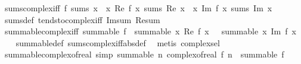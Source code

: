 \begin{isabellebody}
\endisatagproof
{\isafoldproof}%
%
\isadelimproof
\isanewline
%
\endisadelimproof
\isanewline
{}\isamarkupfalse%
\ sums{\isacharunderscore}{\kern0pt}complex{\isacharunderscore}{\kern0pt}iff{\isacharcolon}{\kern0pt}\ {\isachardoublequoteopen}f\ sums\ x\ {\isasymlongleftrightarrow}\ {\isacharparenleft}{\kern0pt}{\isacharparenleft}{\kern0pt}{\isasymlambda}x{\isachardot}{\kern0pt}\ Re\ {\isacharparenleft}{\kern0pt}f\ x{\isacharparenright}{\kern0pt}{\isacharparenright}{\kern0pt}\ sums\ Re\ x{\isacharparenright}{\kern0pt}\ {\isasymand}\ {\isacharparenleft}{\kern0pt}{\isacharparenleft}{\kern0pt}{\isasymlambda}x{\isachardot}{\kern0pt}\ Im\ {\isacharparenleft}{\kern0pt}f\ x{\isacharparenright}{\kern0pt}{\isacharparenright}{\kern0pt}\ sums\ Im\ x{\isacharparenright}{\kern0pt}{\isachardoublequoteclose}\isanewline
%
\isadelimproof
\ \ %
\endisadelimproof
%
\isatagproof
{}\isamarkupfalse%
\ sums{\isacharunderscore}{\kern0pt}def\ tendsto{\isacharunderscore}{\kern0pt}complex{\isacharunderscore}{\kern0pt}iff\ Im{\isacharunderscore}{\kern0pt}sum\ Re{\isacharunderscore}{\kern0pt}sum\ \isacommand{{\isachardot}{\kern0pt}{\isachardot}{\kern0pt}}\isamarkupfalse%
%
\endisatagproof
{\isafoldproof}%
%
\isadelimproof
\isanewline
%
\endisadelimproof
\isanewline
{}\isamarkupfalse%
\ summable{\isacharunderscore}{\kern0pt}complex{\isacharunderscore}{\kern0pt}iff{\isacharcolon}{\kern0pt}\ {\isachardoublequoteopen}summable\ f\ {\isasymlongleftrightarrow}\ summable\ {\isacharparenleft}{\kern0pt}{\isasymlambda}x{\isachardot}{\kern0pt}\ Re\ {\isacharparenleft}{\kern0pt}f\ x{\isacharparenright}{\kern0pt}{\isacharparenright}{\kern0pt}\ {\isasymand}\ \ summable\ {\isacharparenleft}{\kern0pt}{\isasymlambda}x{\isachardot}{\kern0pt}\ Im\ {\isacharparenleft}{\kern0pt}f\ x{\isacharparenright}{\kern0pt}{\isacharparenright}{\kern0pt}{\isachardoublequoteclose}\isanewline
%
\isadelimproof
\ \ %
\endisadelimproof
%
\isatagproof
{}\isamarkupfalse%
\ summable{\isacharunderscore}{\kern0pt}def\ sums{\isacharunderscore}{\kern0pt}complex{\isacharunderscore}{\kern0pt}iff{\isacharbrackleft}{\kern0pt}abs{\isacharunderscore}{\kern0pt}def{\isacharbrackright}{\kern0pt}\ \isamarkupfalse%
\ {\isacharparenleft}{\kern0pt}metis\ complex{\isachardot}{\kern0pt}sel{\isacharparenright}{\kern0pt}%
\endisatagproof
{\isafoldproof}%
%
\isadelimproof
\isanewline
%
\endisadelimproof
\isanewline
{}\isamarkupfalse%
\ summable{\isacharunderscore}{\kern0pt}complex{\isacharunderscore}{\kern0pt}of{\isacharunderscore}{\kern0pt}real\ {\isacharbrackleft}{\kern0pt}simp{\isacharbrackright}{\kern0pt}{\isacharcolon}{\kern0pt}\ {\isachardoublequoteopen}summable\ {\isacharparenleft}{\kern0pt}{\isasymlambda}n{\isachardot}{\kern0pt}\ complex{\isacharunderscore}{\kern0pt}of{\isacharunderscore}{\kern0pt}real\ {\isacharparenleft}{\kern0pt}f\ n{\isacharparenright}{\kern0pt}{\isacharparenright}{\kern0pt}\ {\isasymlongleftrightarrow}\ summable\ f{\isachardoublequoteclose}\isanewline

\end{isabellebody}
